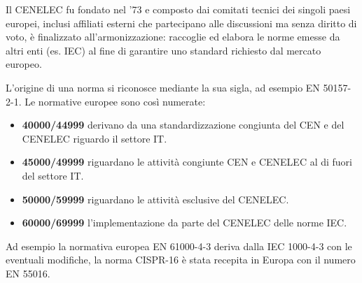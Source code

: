 Il CENELEC fu fondato nel '73 e composto dai comitati tecnici dei singoli paesi europei, inclusi affiliati
esterni che partecipano alle discussioni ma senza diritto di voto, è finalizzato all'armonizzazione: raccoglie 
ed elabora le norme emesse da altri enti (es. IEC) al fine di garantire uno standard richiesto dal mercato
europeo.

L'origine di una norma si riconosce mediante la sua sigla, ad esempio EN 50157-2-1.
Le normative europee sono così numerate:
\begin{itemize}
 \item \textbf{40000/44999} derivano da una standardizzazione congiunta del CEN e del CENELEC riguardo
 il settore IT.
 \item \textbf{45000/49999} riguardano le attività congiunte CEN e CENELEC al di fuori del settore IT.
 \item \textbf{50000/59999} riguardano le attività esclusive del CENELEC.
 \item \textbf{60000/69999} l'implementazione da parte del CENELEC delle norme IEC.
\end{itemize}
Ad esempio la normativa europea EN 61000-4-3 deriva dalla IEC 1000-4-3 con le eventuali modifiche, la 
norma CISPR-16 è stata recepita in Europa con il numero EN 55016. %



